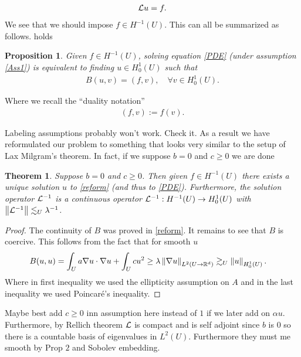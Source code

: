 \documentclass[12pt]{article}
\newtheorem{theorem}{Theorem}
\newtheorem{proposition}{Proposition}
\newcommand{\red}[1]{{\color{red}#1}}
\renewcommand{\norm}[1]{\left\lVert #1 \right\rVert}\renewcommand{\abs}[1]{\left| #1 \right|}
\begin{document}
\begin{align*}
  \mathcal{L} u=f.
\end{align*}
We see that we should impose $f \in H^{-1}(U)$. This can all be summarized as follows. holds
\begin{proposition}
  Given $f \in  H^{-1}(U)$, solving equation \eqref{PDE} (under assumption \ref{Ass1}) is equivalent to finding $u \in H_0^1(U)$ such that
  \begin{align}\label{reform}
    B(u,v)= (f,v) , \quad\forall v \in  H^{1}_0(U).
  \end{align}
\end{proposition}
Where we recall the ``duality notation''
\begin{align*}
  (f,v):= f(v) .
\end{align*}

\red{Labeling assumptions probably won't work. Check it.}
As a result we have reformulated our problem to something that looks very similar to the setup of Lax Milgram's theorem. In fact, if we suppose $b=0$ and $c \geq 0$ we are done
\begin{theorem}
  Suppose $b=0$  and $c \geq 0$. Then given $f \in  H^{-1}(U)$ there exists a unique solution $u$ to \eqref{reform} (and thus to \eqref{PDE}). Furthermore, the solution operator $\mathcal{L}^{-1}$ is a continuous operator	 $\mathcal{L}^{-1}: H^{-1}(U) \to H^1_0(U)$ with $\norm{\Ll^{-1}} \lesssim_U \lambda ^{-1}$.
\end{theorem}
\begin{proof}
  The continuity of $B$ was proved in  \eqref{reform}. It remains to see that $B$ is coercive. This follows from the fact that for smooth $u$
  \begin{align}\label{b=0}
    B(u,u) & = \int_{U}a \nabla u \cdot \nabla u + \int_{U} cu^2 \geq \lambda \norm{\nabla u}_{L^2(U \to \R^d)} \gtrsim_U \norm{u}_{H^1_0(U)}.
  \end{align}
  Where in first inequality we used the ellipticity assumption on $A$ and in the last inequality we used Poincaré's inequality.
\end{proof}
\red{Maybe best add $c \geq 0$ inn assumption here instead of $1$ if we later add on  $\alpha u$.}
Furthermore, by Rellich theorem $\mathcal{L}$ is compact and is self adjoint since $b$ is  $0$ so there is a countable basis of eigenvalues in  $L^2(U)$. Furthermore they must me smooth by Prop  $2$ and Sobolev embedding.
\end{document}

